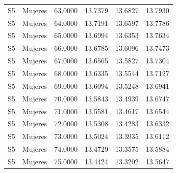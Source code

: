 \begin{longtable}{llrrrr}
S5 & Mujeres & 63.0000 & 13.7379 & 13.6827 & 13.7930 \\
S5 & Mujeres & 64.0000 & 13.7191 & 13.6597 & 13.7786 \\
S5 & Mujeres & 65.0000 & 13.6994 & 13.6353 & 13.7634 \\
S5 & Mujeres & 66.0000 & 13.6785 & 13.6096 & 13.7473 \\
S5 & Mujeres & 67.0000 & 13.6565 & 13.5827 & 13.7304 \\
S5 & Mujeres & 68.0000 & 13.6335 & 13.5544 & 13.7127 \\
S5 & Mujeres & 69.0000 & 13.6094 & 13.5248 & 13.6941 \\
S5 & Mujeres & 70.0000 & 13.5843 & 13.4939 & 13.6747 \\
S5 & Mujeres & 71.0000 & 13.5581 & 13.4617 & 13.6544 \\
S5 & Mujeres & 72.0000 & 13.5308 & 13.4283 & 13.6332 \\
S5 & Mujeres & 73.0000 & 13.5024 & 13.3935 & 13.6112 \\
S5 & Mujeres & 74.0000 & 13.4729 & 13.3575 & 13.5884 \\
S5 & Mujeres & 75.0000 & 13.4424 & 13.3202 & 13.5647 \\
\end{longtable}

